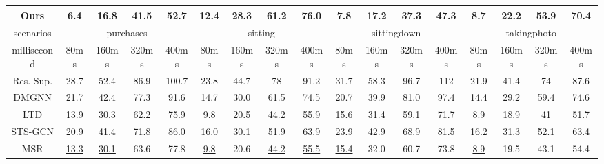 \begin{table}[h]
{\begin{tabular}{c|cccc|cccc|cccc|cccc}
    Ours   & \textbf{6.4}  & \textbf{16.8} & \textbf{41.5} & \textbf{52.7} & \textbf{12.4} & \textbf{28.3} & \textbf{61.2} & \textbf{76.0} & \textbf{7.8}  & \textbf{17.2} & \textbf{37.3} & \textbf{47.3} & \textbf{8.7} & \textbf{22.2} & \textbf{53.9} & \textbf{70.4} \\ \hline
    scenarios   & \multicolumn{4}{c|}{purchases}                                 & \multicolumn{4}{c|}{sitting}                                   & \multicolumn{4}{c|}{sittingdown}                               & \multicolumn{4}{c}{takingphoto}                              \\ \hline
    millisecond & 80ms          & 160ms         & 320ms         & 400ms         & 80ms          & 160ms         & 320ms         & 400ms         & 80ms          & 160ms         & 320ms         & 400ms         & 80ms         & 160ms         & 320ms         & 400ms         \\ \hline
    Res. Sup.   & 28.7          & 52.4          & 86.9          & 100.7         & 23.8          & 44.7          & 78            & 91.2          & 31.7          & 58.3          & 96.7          & 112           & 21.9         & 41.4          & 74            & 87.6          \\
    DMGNN & 21.7          & 42.4          & 77.3          & 91.6          & 14.7          & 30.0          & 61.5          & 74.5          & 20.7          & 39.9          & 81.0          & 97.4          & 14.4         & 29.2          & 59.4          & 74.6          \\
    LTD   & 13.9          & 30.3          & \underline{62.2}          & \underline{75.9}          & 9.8           & \underline{20.5}          & 44.2          & 55.9          & 15.6          & \underline{31.4}          & \underline{59.1}          & \underline{71.7}          & 8.9          & \underline{18.9}          & \underline{41}            & \underline{51.7}          \\
    STS-GCN              & 20.9                 & 41.4                 & 71.8                 & 86.0                          & 16.0                 & 30.1                 & 51.9                 & 63.9                 & 23.9                 & 42.9                 & 68.9                 & 81.5                 & 16.2                 & 31.3                 & 52.1                 & 63.4                 \\
    MSR   & \underline{13.3}          & \underline{30.1}          & 63.6          & 77.8          & \underline{9.8}           & 20.6          & \underline{44.2}          & \underline{55.5}          & \underline{15.4}          & 32.0          & 60.7          & 73.8          & \underline{8.9}          & 19.5          & 43.1          & 54.4          \\

\end{tabular}}
\end{table}
